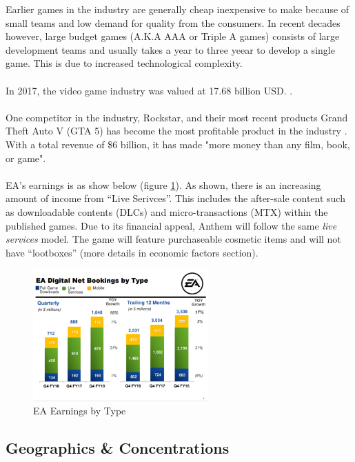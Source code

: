 \documentclass[10pt,letterpaper]{article}
\begin{document}
Earlier games in the industry are generally cheap inexpensive to make because of small teams and low demand for quality from the consumers. In recent decades however, large budget games (A.K.A AAA or Triple A games) consists of large development teams and usually takes  a year to three yeear to develop a single game. This is due to increased technological complexity.\cite{cost-game}\\
\\
In 2017, the video game industry was valued at 17.68 billion USD. \cite{video-game-industry-stats}.\\
\\
One competitor in the industry, Rockstar, and their most recent products Grand Theft Auto V (GTA 5) has become the most profitable product in the industry \cite{IGN-gta5}. With a total revenue of \$6 billion, it has made "more money than any film, book, or game".\\
\\
EA's earnings is as show below (figure \ref{fig:ea-revenue})\cite{ea-earnings}. As shown, there is an increasing amount of income from ``Live Serivces''. This includes the after-sale content such as downloadable contents (DLCs) and micro-transactions (MTX) within the published games. Due to its financial appeal, Anthem will follow the same \textit{live services} model. The game will feature purchaseable cosmetic items  and will not have ``lootboxes'' (more details in economic factors section).\\

\begin{figure}[H]
	\centering
	\includegraphics[width=0.6\textwidth]{assets/ea-revenue}
	\caption{EA Earnings by Type}
	\label{fig:ea-revenue}
\end{figure}

\subsection{Geographics \& Concentrations}
\end{document}
